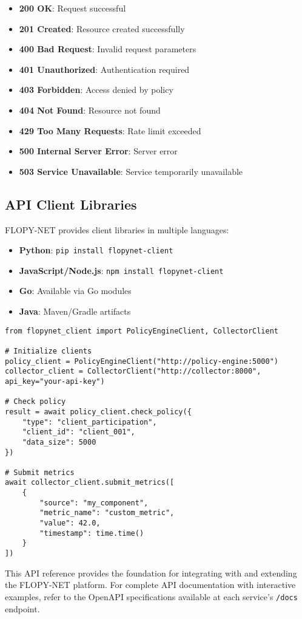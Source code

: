 \begin{itemize}
    \item \textbf{200 OK}: Request successful
    \item \textbf{201 Created}: Resource created successfully
    \item \textbf{400 Bad Request}: Invalid request parameters
    \item \textbf{401 Unauthorized}: Authentication required
    \item \textbf{403 Forbidden}: Access denied by policy
    \item \textbf{404 Not Found}: Resource not found
    \item \textbf{429 Too Many Requests}: Rate limit exceeded
    \item \textbf{500 Internal Server Error}: Server error
    \item \textbf{503 Service Unavailable}: Service temporarily unavailable
\end{itemize}

\subsection{API Client Libraries}

FLOPY-NET provides client libraries in multiple languages:

\begin{itemize}
    \item \textbf{Python}: \texttt{pip install flopynet-client}
    \item \textbf{JavaScript/Node.js}: \texttt{npm install flopynet-client}
    \item \textbf{Go}: Available via Go modules
    \item \textbf{Java}: Maven/Gradle artifacts
\end{itemize}

\begin{lstlisting}[style=pythoncode, caption=Python Client Library Example]
from flopynet_client import PolicyEngineClient, CollectorClient

# Initialize clients
policy_client = PolicyEngineClient("http://policy-engine:5000")
collector_client = CollectorClient("http://collector:8000", api_key="your-api-key")

# Check policy
result = await policy_client.check_policy({
    "type": "client_participation",
    "client_id": "client_001",
    "data_size": 5000
})

# Submit metrics
await collector_client.submit_metrics([
    {
        "source": "my_component",
        "metric_name": "custom_metric",
        "value": 42.0,
        "timestamp": time.time()
    }
])
\end{lstlisting}

This API reference provides the foundation for integrating with and extending the FLOPY-NET platform. For complete API documentation with interactive examples, refer to the OpenAPI specifications available at each service's \texttt{/docs} endpoint.

